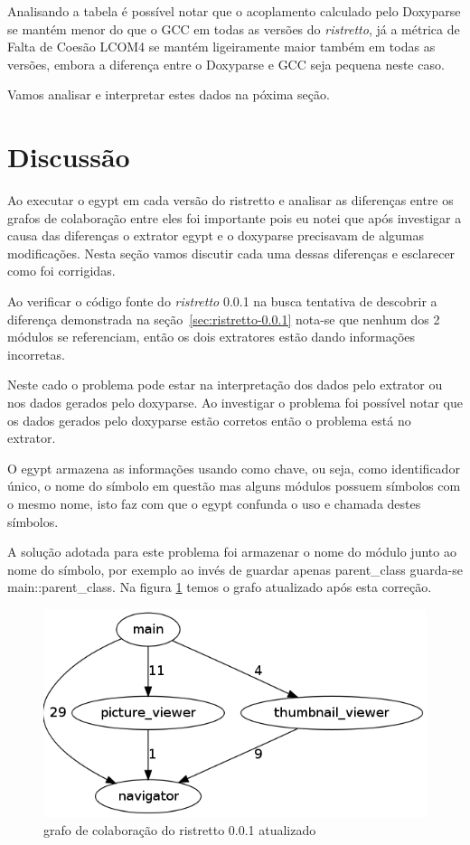 Analisando a tabela é possível notar que o acoplamento calculado pelo Doxyparse
se mantém menor do que o GCC em todas as versões do {\it ristretto}, já a métrica de
Falta de Coesão LCOM4 se mantém ligeiramente maior também em todas as versões,
embora a diferença entre o Doxyparse e GCC seja pequena neste caso.

Vamos analisar e interpretar estes dados na póxima seção.

\section{Discussão} \label{sec:discussao}

Ao executar o egypt em cada versão do ristretto e analisar as diferenças entre
os grafos de colaboração entre eles foi importante pois eu notei que após
investigar a causa das diferenças o extrator egypt e o doxyparse precisavam de
algumas modificações. Nesta seção vamos discutir cada uma dessas diferenças e
esclarecer como foi corrigidas.

Ao verificar o código fonte do {\it ristretto} 0.0.1 na busca tentativa de descobrir a diferença demonstrada na seção~\ref{sec:ristretto-0.0.1} 
nota-se que nenhum dos 2 módulos se referenciam, então os dois extratores estão dando informações incorretas.

Neste cado o problema pode estar na interpretação dos dados pelo extrator ou nos dados
gerados pelo doxyparse. Ao investigar o problema foi possível notar que os
dados gerados pelo doxyparse estão corretos então o problema está no extrator.

O egypt armazena as informações usando como chave, ou seja, como identificador
único, o nome do símbolo em questão mas alguns módulos possuem símbolos com o
mesmo nome, isto faz com que o egypt confunda o uso e chamada destes símbolos.

A solução adotada para este problema foi armazenar o nome do módulo junto ao
nome do símbolo, por exemplo ao invés de guardar apenas parent\_class guarda-se
main::parent\_class. Na figura \ref{fig:ristretto-0.0.1-doxyparse-2} temos o
grafo atualizado após esta correção.

\begin{figure}[h]
\center
\includegraphics[scale=0.3]{imagens/ristretto-0_0_1-doxyparse-2}
\caption{grafo de colaboração do ristretto 0.0.1 atualizado}
\label{fig:ristretto-0.0.1-doxyparse-2}
\end{figure}

